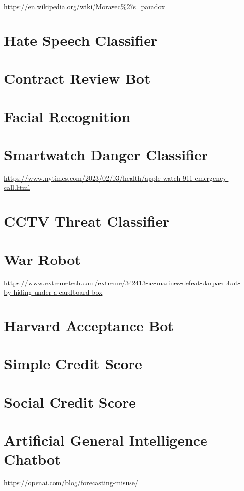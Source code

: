 \url{https://en.wikipedia.org/wiki/Moravec\%27s_paradox}

\section{Hate Speech Classifier}
\section{Contract Review Bot}
\section{Facial Recognition}
\section{Smartwatch Danger Classifier} 

\url{https://www.nytimes.com/2023/02/03/health/apple-watch-911-emergency-call.html}

\section{CCTV Threat Classifier}
\section{War Robot}

\url{https://www.extremetech.com/extreme/342413-us-marines-defeat-darpa-robot-by-hiding-under-a-cardboard-box}

\section{Harvard Acceptance Bot}
\section{Simple Credit Score}
\section{Social Credit Score}
\section{Artificial General Intelligence Chatbot}

\url{https://openai.com/blog/forecasting-misuse/}
